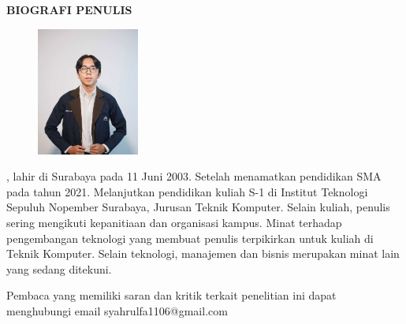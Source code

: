\begin{center}
  \Large
  \textbf{BIOGRAFI PENULIS}
\end{center}


\vspace{2ex}

\begin{figure}
  \centering
  \vspace{-3ex}
  \includegraphics[width=0.3\textwidth]{BiografiPenulis/fotoku.png}
  \vspace{-4ex}
\end{figure}

\name{}, lahir di Surabaya pada 11 Juni 2003. Setelah menamatkan pendidikan SMA pada tahun 2021. Melanjutkan pendidikan kuliah S-1 di Institut Teknologi Sepuluh Nopember Surabaya, Jurusan Teknik Komputer. Selain kuliah, penulis sering mengikuti kepanitiaan dan organisasi kampus. Minat terhadap pengembangan teknologi yang membuat penulis terpikirkan untuk kuliah di Teknik Komputer. Selain teknologi, manajemen dan bisnis merupakan minat lain yang sedang ditekuni.

Pembaca yang memiliki saran dan kritik terkait penelitian ini dapat menghubungi email syahrulfa1106@gmail.com
